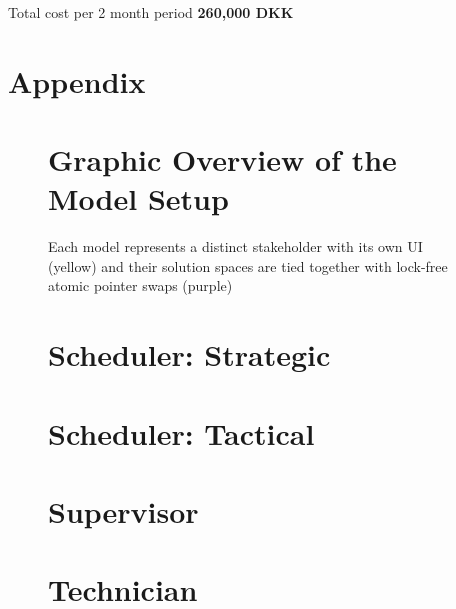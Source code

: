 \documentclass{article}
\begin{document}
Total cost per 2 month period \textbf{260,000 DKK}

\section{Appendix}


\begin{figure}[H]
    \section{Graphic Overview of the Model Setup}
    \centering
    \drawModelSetupHexagon[simplified=true]
    \caption{Each model represents a distinct stakeholder with its own UI (yellow) and their solution spaces are tied together with
        lock-free atomic pointer swaps (purple)}
\end{figure}


\begin{figure}[H]
    \section{Scheduler: Strategic}
    \strategicModel[clustering=true, beta=false, normal=false, multiskill=true]
\end{figure}



\begin{figure}[H]
    \section{Scheduler: Tactical}
    \tacticalModel[]
\end{figure}


\begin{figure}[H]
    \section{Supervisor}
    \supervisorModel[]
\end{figure}


\begin{figure}[H]
    \section{Technician}
    \operationalModel[]
\end{figure}
\end{document}
